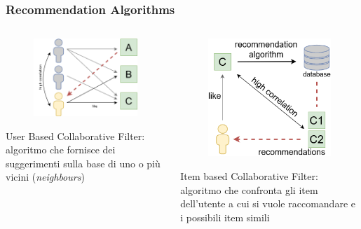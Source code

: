 \begin{frame}
    \frametitle{Recommendation Algorithms}
    \begin{columns}
        \begin{column}{0.5\textwidth}
            \begin{figure}
                \centering
                \includegraphics[scale=0.5]{images/UB_CF_ex}
           \end{figure}
           \alert{User Based Collaborative Filter}: algoritmo che fornisce dei suggerimenti sulla base di uno o più vicini (\textit{neighbours}) 
        \end{column}
        \begin{column}{0.5\textwidth}
            \begin{figure}
                \centering
                \includegraphics[scale=0.55]{images/IB_CF_ex2}
            \end{figure}
            \alert{Item based Collaborative Filter}: algoritmo che confronta gli item dell'utente a cui si vuole raccomandare e i possibili item simili 
        \end{column}
    \end{columns}
\end{frame}

